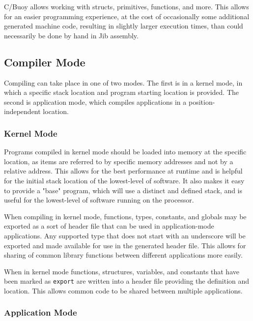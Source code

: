 \documentclass{article}
\begin{document}


C/Buoy allows working with structs, primitives, functions, and more. This allows for an easier programming experience, at the cost of occasionally some additional generated machine code, resulting in slightly larger execution times, than could necessarily be done by hand in Jib assembly.

\subsection{Compiler Mode}

Compiling can take place in one of two modes. The first is in a kernel mode, in which a specific stack location and program starting location is provided. The second is application mode, which compiles applications in a position-independent location.

\subsubsection{Kernel Mode}

Programs compiled in kernel mode should be loaded into memory at the specific location, as items are referred to by specific memory addresses and not by a relative address. This allows for the best performance at runtime and is helpful for the initial stack location of the lowest-level of software. It also makes it easy to provide a "base" program, which will use a distinct and defined stack, and is useful for the lowest-level of software running on the processor.

When compiling in kernel mode, functions, types, constants, and globals may be exported as a sort of header file that can be used in application-mode applications. Any supported type that does not start with an underscore will be exported and made available for use in the generated header file. This allows for sharing of common library functions between different applications more easily.

When in kernel mode functions, structures, variables, and constants that have been marked as \texttt{export} are written into a header file providing the definition and location. This allows common code to be shared between multiple applications.

\subsubsection{Application Mode}
\end{document}
